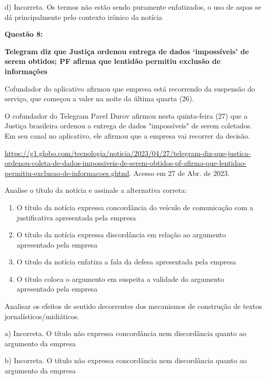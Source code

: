 d) Incorreta. Os termos não estão sendo puramente enfatizados, o uso de
aspas se dá principalmente pelo contexto irônico da notícia

\textbf{Questão 8:}

\textbf{Telegram diz que Justiça ordenou entrega de dados `impossíveis'
de serem obtidos; PF afirma que lentidão permitiu exclusão de
informações}

Cofundador do aplicativo afirmou que empresa está recorrendo da
suspensão do serviço, que começou a valer na noite da última quarta
(26).

O cofundador do Telegram Pavel Durov afirmou nesta quinta-feira (27) que
a Justiça brasileira ordenou a entrega de dados "impossíveis" de serem
coletados. Em seu canal no aplicativo, ele afirmou que a empresa vai
recorrer da decisão.

\href{https://g1.globo.com/tecnologia/noticia/2023/04/27/telegram-diz-que-justica-ordenou-coleta-de-dados-impossiveis-de-serem-obtidos-pf-afirma-que-lentidao-permitiu-exclusao-de-informacoes.ghtml}{{https://g1.globo.com/tecnologia/noticia/2023/04/27/telegram-diz-que-justica-ordenou-coleta-de-dados-impossiveis-de-serem-obtidos-pf-afirma-que-lentidao-permitiu-exclusao-de-informacoes.ghtml}}.
Acesso em 27 de Abr. de 2023.

Analise o título da notícia e assinale a alternativa correta:

\begin{enumerate}
\def\labelenumi{\alph{enumi})}
\item
  O título da notícia expressa concordância do veículo de comunicação
  com a justificativa apresentada pela empresa
\item
  O título da notícia expressa discordância em relação ao argumento
  apresentado pela empresa
\item
  O título da notícia enfatiza a fala da defesa apresentada pela empresa
\item
  O título coloca o argumento em suspeita a validade do argumento
  apresentado pela empresa
\end{enumerate}

Analisar os efeitos de sentido decorrentes dos mecanismos de construção
de textos jornalísticos/midiáticos.

a) Incorreta. O título não expressa concordância nem discordância quanto
ao argumento da empresa

b) Incorreta. O título não expressa concordância nem discordância quanto
ao argumento da empresa

